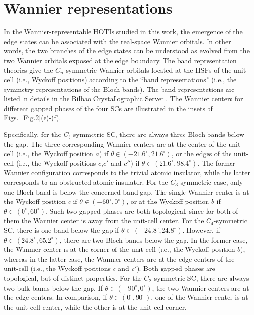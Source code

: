\documentclass[doublecol]{epl2}
\begin{document}
\section{Wannier representations} 
In the Wannier-representable HOTIs studied in this work, the emergence of the edge states can be associated with the real-space Wannier orbitals. In other words, the two branches of the edge states can be understood as evolved from the two Wannier orbitals exposed at the edge boundary. The band representation theories give the $C_n$-symmetric Wannier orbitals located at the HSPs of the unit cell (i.e., Wyckoff positions) according to the ``band representations'' (i.e., the symmetry representations of the Bloch bands). The band representations  are listed in details in the Bilbao Crystallographic Server \cite{timmurphy.org1}. The Wannier centers for different gapped phases of the four SCs are illustrated in the insets of Figs.~\ref{Fig.2}(e)-(f).


Specifically, for the $C_6$-symmetric SC, there are always three Bloch bands below the gap. The three corresponding Wannier centers are at the center of the unit cell (i.e., the Wyckoff position $a$) if $\theta\in(-21.6^\circ,21.6^\circ)$, or the edges of the unit-cell (i.e., the Wyckoff positions $c$,$c'$ and $c''$) if $\theta\in(21.6^\circ,98.4^\circ)$. The former Wannier configuration corresponds to the trivial atomic insulator, while the latter corresponds to an obstructed atomic insulator. For the $C_3$-symmetric case, only one Bloch band is below the concerned band gap. The single Wannier center is at the Wyckoff position $c$ if $\theta\in(-60^\circ,0^\circ)$, or at the Wyckoff position $b$ if $\theta\in(0^\circ,60^\circ)$. Such two gapped phases are both topological, since for both of them the Wannier center is away from the unit-cell center. For the $C_4$-symmetric SC, there is one band below the gap if $\theta\in(-24.8^\circ,24.8^\circ)$. However, if $\theta\in(24.8^\circ,65.2^\circ)$, there are two Bloch bands below the gap. In the former case, the Wannier center is at the corner of the unit cell (i.e., the Wyckoff position $b$), whereas in the latter case, the Wannier centers are at the edge centers of the unit-cell (i.e., the Wyckoff positions $c$ and $c'$). Both gapped phases are topological, but of distinct properties. For the $C_2$-symmetric SC, there are always two bulk bands below the gap. If $\theta\in(-90^\circ,0^\circ)$, the two Wannier centers are at the edge centers. In comparison, if $\theta\in(0^\circ,90^\circ)$, one of the Wannier center is at the unit-cell center, while the other is at the unit-cell corner. 
\end{document}
